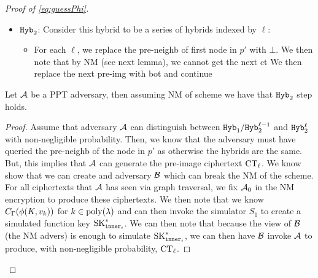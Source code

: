 \begin{proof}[Proof of \cref{eq:guessPhi}]
\begin{itemize}
		\item $\texttt{Hyb}_2$: Consider this hybrid to be a series of hybrids indexed by $\ell$:
		\begin{itemize}
			\item For each $\ell$, we replace the pre-neighb of first node in $p'$ with $\bot$. We then note that by NM (see next lemma), we cannot get the next ct
		We then replace the next pre-img with bot and continue
		\end{itemize}
	\end{itemize}
	\begin{lemma}
		\label{lem:NM}
		Let $\mathcal{A}$ be a PPT adversary, then assuming NM of scheme we have that $\texttt{Hyb}_2$ step holds.
		\begin{proof}
			Assume that adversary $\mathcal{A}$ can distinguish between $\texttt{Hyb}_1 / \texttt{Hyb}_2^{\ell - 1}$ and $\texttt{Hyb}_2^\ell$ with non-negligible probability.
			Then, we know that the adversary must have queried the pre-neighb of the node in $p'$
			as otherwise the hybrids are the same.
			But, this implies that $\mathcal{A}$ can generate the pre-image ciphertext $\text{CT}_\ell$.
			We know show that we can create and adversary $\mathcal{B}$ which can break the NM of the scheme.
			For all ciphertexts that $\mathcal{A}$ has seen via graph traversal, we fix $\mathcal{A}_0$ in the NM
			encryption to produce these ciphertexts. We then note that we know $C_\Gamma(\phi(K, v_k))$
			for $k \in \operatorname{poly}(\lambda)$ and can then invoke the simulator $S_1$ to create a simulated function key $\text{SK}_{\texttt{inner}_i}^*$.
			We can then note that because the view of $\mathcal{B}$ (the NM advers) is enough to simulate $\text{SK}_{\texttt{inner}_i}^*$, we can then
			have $\mathcal{B}$ invoke $\mathcal{A}$ to produce, with non-negligible probability, $\text{CT}_\ell$.




		\end{proof}
	\end{lemma}
	
\end{proof}

